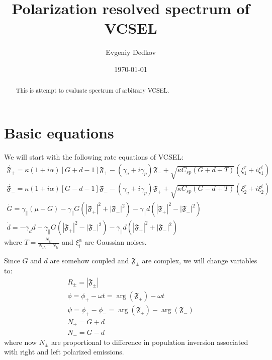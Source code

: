 \documentclass[12pt, notitlepage]{report}
\title{Polarization resolved spectrum of VCSEL}
\author{Evgeniy Dedkov}
\date{\today}
\begin{document}
	
	\newcommand\scalemath[2]{\scalebox{#1}{\mbox{\ensuremath{\displaystyle #2}}}}
	\newcommand{\F}{\boldsymbol{\mathfrak{F}}}
	\newcommand{\n}{\boldsymbol{\mathfrak{n}}}
	\newcommand{\N}{\boldsymbol{\mathcal{N}}}
	\newcommand{\Q}{\mathcal{Q}}
	\newcommand{\gp}{\gamma_{\parallel}}
	\newcommand{\bV}{\boldsymbol{V}}
	
	\maketitle
	\thispagestyle{empty}
	
	\begin{abstract}
		This is attempt to evaluate spectrum of arbitrary VCSEL.
	\end{abstract}
	
	\section{Basic equations}
	We will start with the following rate equations of VCSEL:
	\begin{gather}
		\label{main_rate1}
		\dot{\F_+} = \kappa(1+i\alpha)\left[G + d - 1\right] \F_+ - (\gamma_a + i\gamma_p) \F_- + \sqrt{\kappa C_{sp} (G+d+T)}(\xi_1^r + i\xi_1^i)\\
		\dot{\F_-} = \kappa(1+i\alpha)\left[G - d - 1\right] \F_- - (\gamma_a + i\gamma_p) \F_+ + \sqrt{\kappa C_{sp} (G-d+T)}(\xi_2^r + i\xi_2^i)\\
		\dot{G} = \gp\left(\mu-G\right) - \gp G(|\F_+|^2+|\F_-|^2) - \gp d(|\F_+|^2 - |\F_-|^2) \\
		\label{main_rate4}
		\dot{d} = -\gamma_d d - \gp G(|\F_+|^2-|\F_-|^2) - \gp d(|\F_+|^2+|\F_-|^2)
	\end{gather}
	where $T = \frac{N_{tr}}{N_{th} - N_{tr}}$ and $\xi_i^\alpha$ are Gaussian noises. 
	
	Since $G$ and $d$ are somehow coupled and $\F_\pm$ are complex, we will change variables to:
	\begin{gather}
		R_\pm = |\F_\pm| \\
		\phi = \phi_+ - \omega t = \arg (\F_+) - \omega t \\
		\psi = \phi_+ - \phi_- = \arg(\F_+) - \arg(\F_-) \\
		N_+ = G+d \\
		N_- = G-d
	\end{gather}
	where now $N_\pm$ are proportional to difference in population inversion associated with right and left polarized emissions.
	
\end{document}
